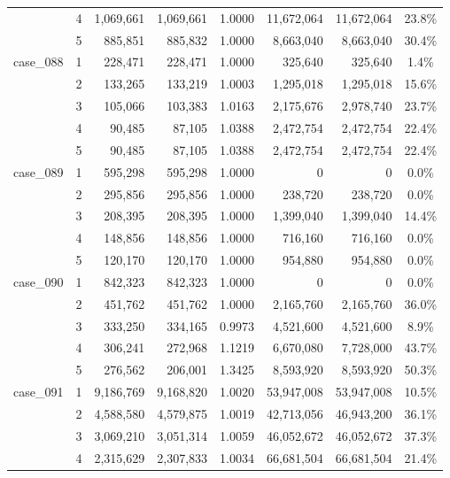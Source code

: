 \begin{footnotesize}
\begin{longtable}{l c rr c rr c}
 & 4 & 1{,}069{,}661 & 1{,}069{,}661 & 1.0000 & 11{,}672{,}064 & 11{,}672{,}064 & 23.8\% \\
 & 5 & 885{,}851 & 885{,}832 & 1.0000 & 8{,}663{,}040 & 8{,}663{,}040 & 30.4\% \\
\addlinespace[2pt]
case\_088 & 1 & 228{,}471 & 228{,}471 & 1.0000 & 325{,}640 & 325{,}640 & 1.4\% \\
 & 2 & 133{,}265 & 133{,}219 & 1.0003 & 1{,}295{,}018 & 1{,}295{,}018 & 15.6\% \\
 & 3 & 105{,}066 & 103{,}383 & 1.0163 & 2{,}175{,}676 & 2{,}978{,}740 & 23.7\% \\
 & 4 & 90{,}485 & 87{,}105 & 1.0388 & 2{,}472{,}754 & 2{,}472{,}754 & 22.4\% \\
 & 5 & 90{,}485 & 87{,}105 & 1.0388 & 2{,}472{,}754 & 2{,}472{,}754 & 22.4\% \\
\addlinespace[2pt]
case\_089 & 1 & 595{,}298 & 595{,}298 & 1.0000 & 0 & 0 & 0.0\% \\
 & 2 & 295{,}856 & 295{,}856 & 1.0000 & 238{,}720 & 238{,}720 & 0.0\% \\
 & 3 & 208{,}395 & 208{,}395 & 1.0000 & 1{,}399{,}040 & 1{,}399{,}040 & 14.4\% \\
 & 4 & 148{,}856 & 148{,}856 & 1.0000 & 716{,}160 & 716{,}160 & 0.0\% \\
 & 5 & 120{,}170 & 120{,}170 & 1.0000 & 954{,}880 & 954{,}880 & 0.0\% \\
\addlinespace[2pt]
case\_090 & 1 & 842{,}323 & 842{,}323 & 1.0000 & 0 & 0 & 0.0\% \\
 & 2 & 451{,}762 & 451{,}762 & 1.0000 & 2{,}165{,}760 & 2{,}165{,}760 & 36.0\% \\
 & 3 & 333{,}250 & 334{,}165 & 0.9973 & 4{,}521{,}600 & 4{,}521{,}600 & 8.9\% \\
 & 4 & 306{,}241 & 272{,}968 & 1.1219 & 6{,}670{,}080 & 7{,}728{,}000 & 43.7\% \\
 & 5 & 276{,}562 & 206{,}001 & 1.3425 & 8{,}593{,}920 & 8{,}593{,}920 & 50.3\% \\
\addlinespace[2pt]
case\_091 & 1 & 9{,}186{,}769 & 9{,}168{,}820 & 1.0020 & 53{,}947{,}008 & 53{,}947{,}008 & 10.5\% \\
 & 2 & 4{,}588{,}580 & 4{,}579{,}875 & 1.0019 & 42{,}713{,}056 & 46{,}943{,}200 & 36.1\% \\
 & 3 & 3{,}069{,}210 & 3{,}051{,}314 & 1.0059 & 46{,}052{,}672 & 46{,}052{,}672 & 37.3\% \\
 & 4 & 2{,}315{,}629 & 2{,}307{,}833 & 1.0034 & 66{,}681{,}504 & 66{,}681{,}504 & 21.4\% \\

\end{longtable}
\end{footnotesize}
